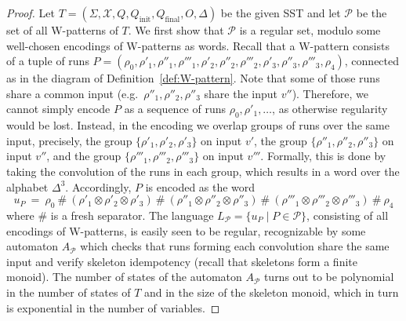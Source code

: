 \documentclass{article}
\newcommand{\var}{\mathcal{X}}
\newcommand{\alp}{\Sigma}
\newcommand{\finalupd}{O}
\begin{document}
\begin{proof}
    Let $T = (\alp, \var, Q, Q_{\mathrm{init}}, Q_{\mathrm{final}}, \finalupd, \Delta)$ 
    be the given SST and 
    let $\mathcal{P}$ be the set of all W-patterns of $T$.
    We first show that $\mathcal{P}$ is a regular set, modulo some 
    well-chosen encodings of W-patterns as words. 
    Recall that a W-pattern consists of a tuple of runs
    $P = (\rho_0,
          \rho'_1,\rho''_1,\rho'''_1,
          \rho'_2,\rho''_2,\rho'''_2,
          \rho'_3,\rho''_3,\rho'''_3,
          \rho_4)$,
    connected as in the diagram of
    Definition~\ref{def:W-pattern}. 
    Note that some of those runs share a common input 
    (e.g.~$\rho''_1,\rho''_2,\rho''_3$ share the input $v''$). 
    Therefore, we cannot simply encode $P$ as a sequence 
    of runs $\rho_0,\rho'_1,\dots$, as otherwise regularity 
    would be lost. 
    Instead, in the encoding we overlap groups of runs 
    over the same input, precisely, 
    the group $\{\rho'_1,\rho'_2,\rho'_3\}$ on input $v'$,
    the group $\{\rho''_1,\rho''_2,\rho''_3\}$ on input $v''$,
    and the group $\{\rho'''_1,\rho'''_2,\rho'''_3\}$ on input $v'''$.
	Formally, this is done by taking the convolution
	of the runs in each group, which results
    in a word over the alphabet $\Delta^3$. 
    Accordingly, $P$ is encoded as the word
    \[
      u_P ~=~ 
      \rho_0 \:\#\: 
      (\rho'_1 \otimes \rho'_2 \otimes \rho'_3) \:\#\:
      (\rho''_1 \otimes \rho''_2 \otimes \rho''_3) \:\#\:
      (\rho'''_1 \otimes \rho'''_2 \otimes \rho'''_3) \:\#\:
      \rho_4
    \]
	where $\#$ is a fresh separator. 
	The language $L_{\mathcal{P}} = \{ u_P \mid P\in\mathcal{P}\}$, 
	consisting of all encodings of W-patterns, is easily seen to
        be regular, recognizable by some automaton $A_{\mathcal{P}}$
        which checks that runs forming each convolution share the
        same input and verify skeleton idempotency 
        (recall that skeletons form a finite monoid). 
	The number of states of the automaton $A_{\mathcal{P}}$ 
	turns out to be polynomial in the number of states of $T$
	and in the size of the skeleton monoid, which
	in turn is exponential in the number of variables. 
    

\end{proof}
\end{document}
